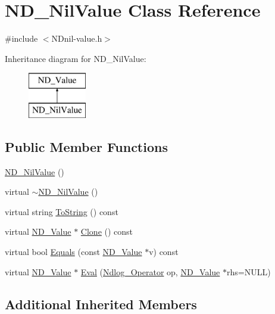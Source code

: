 \hypertarget{class_n_d___nil_value}{\section{N\-D\-\_\-\-Nil\-Value Class Reference}
\label{class_n_d___nil_value}
}


{\ttfamily \#include $<$N\-Dnil-\/value.\-h$>$}

Inheritance diagram for N\-D\-\_\-\-Nil\-Value\-:\begin{figure}[H]
\begin{center}
\leavevmode
\includegraphics[height=2.000000cm]{class_n_d___nil_value}
\end{center}
\end{figure}
\subsection*{Public Member Functions}
\begin{DoxyCompactItemize}
\item 
\hyperlink{class_n_d___nil_value_ae53c8cb6b7afde16ad4d7b217bbbec7d}{N\-D\-\_\-\-Nil\-Value} ()
\item 
virtual \hyperlink{class_n_d___nil_value_a47f275778850df41c328b4d91b127c18}{$\sim$\-N\-D\-\_\-\-Nil\-Value} ()
\item 
virtual string \hyperlink{class_n_d___nil_value_a08f36ab365257992ad4c3cb8a0469106}{To\-String} () const 
\item 
virtual \hyperlink{class_n_d___value}{N\-D\-\_\-\-Value} $\ast$ \hyperlink{class_n_d___nil_value_ac1dbd47c649bb96ece401b6047880603}{Clone} () const 
\item 
virtual bool \hyperlink{class_n_d___nil_value_aba3e3ddeb95b3edca6c068d6b47b338f}{Equals} (const \hyperlink{class_n_d___value}{N\-D\-\_\-\-Value} $\ast$v) const 
\item 
virtual \hyperlink{class_n_d___value}{N\-D\-\_\-\-Value} $\ast$ \hyperlink{class_n_d___nil_value_ae64e5bf09008a69dc2057e2477957cad}{Eval} (\hyperlink{_n_dvalue_8h_afc938fb729c95de25b4d2eb18640b303}{Ndlog\-\_\-\-Operator} op, \hyperlink{class_n_d___value}{N\-D\-\_\-\-Value} $\ast$rhs=N\-U\-L\-L)
\end{DoxyCompactItemize}
\subsection*{Additional Inherited Members}


